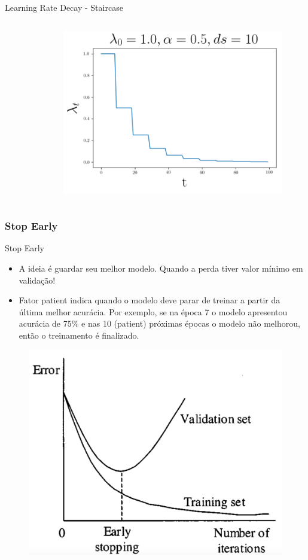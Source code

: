 \documentclass{beamer}
\begin{document}
\begin{frame}
\begin{block}{Learning Rate Decay - Staircase}
\begin{columns}
\begin{column}{0.3 \textwidth}
\begin{figure}
					\end{figure}
				\end{column}
				\begin{column}{0.3 \textwidth}
					\begin{figure}
						\centering
						\includegraphics[width=1\linewidth]{figures/lr_decay9.png}
					\end{figure}
				\end{column}
			\end{columns}
		\end{block}
	\end{frame}	
	
\begin{frame}
	\frametitle{Stop Early}
	\begin{block}{Stop Early}
		\begin{itemize}
			\item A ideia é guardar seu melhor modelo. Quando a perda tiver valor mínimo em validação!
			\item Fator patient indica quando o modelo deve parar de treinar a partir da última melhor acurácia. Por exemplo, se na época 7 o modelo apresentou acurácia de 75\% e nas 10 (patient) próximas épocas o modelo não melhorou, então o treinamento é finalizado.
		\end{itemize}
		\begin{figure}
			\centering
			\includegraphics[width=0.35\linewidth]{figures/early_stop}
		\end{figure}
	\end{block}
\end{frame}	
	
\end{document}
